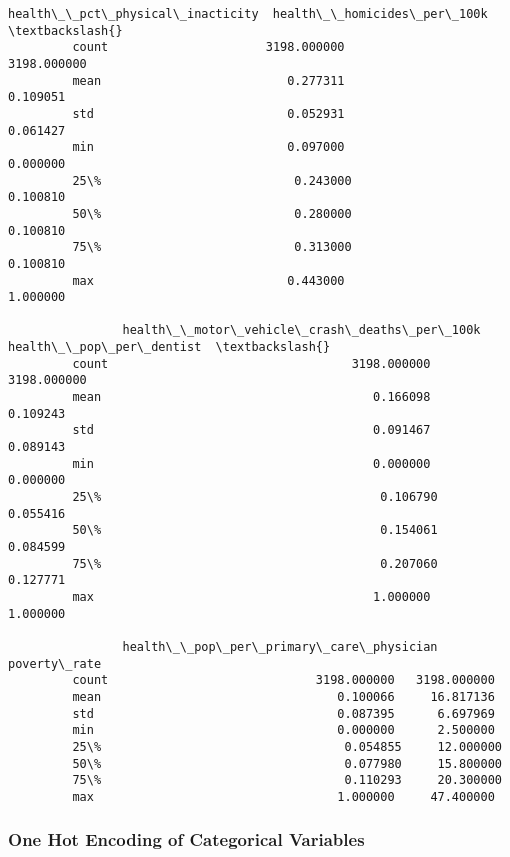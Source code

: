 \documentclass[11pt]{article}
\begin{document}
\begin{Verbatim}[commandchars=\\\{\}]
                health\_\_pct\_physical\_inacticity  health\_\_homicides\_per\_100k  \textbackslash{}
         count                      3198.000000                 3198.000000   
         mean                          0.277311                    0.109051   
         std                           0.052931                    0.061427   
         min                           0.097000                    0.000000   
         25\%                           0.243000                    0.100810   
         50\%                           0.280000                    0.100810   
         75\%                           0.313000                    0.100810   
         max                           0.443000                    1.000000   
         
                health\_\_motor\_vehicle\_crash\_deaths\_per\_100k  health\_\_pop\_per\_dentist  \textbackslash{}
         count                                  3198.000000              3198.000000   
         mean                                      0.166098                 0.109243   
         std                                       0.091467                 0.089143   
         min                                       0.000000                 0.000000   
         25\%                                       0.106790                 0.055416   
         50\%                                       0.154061                 0.084599   
         75\%                                       0.207060                 0.127771   
         max                                       1.000000                 1.000000   
         
                health\_\_pop\_per\_primary\_care\_physician  poverty\_rate  
         count                             3198.000000   3198.000000  
         mean                                 0.100066     16.817136  
         std                                  0.087395      6.697969  
         min                                  0.000000      2.500000  
         25\%                                  0.054855     12.000000  
         50\%                                  0.077980     15.800000  
         75\%                                  0.110293     20.300000  
         max                                  1.000000     47.400000  
\end{Verbatim}
            
    \subsubsection{One Hot Encoding of Categorical
Variables}\label{one-hot-encoding-of-categorical-variables}
\end{document}
